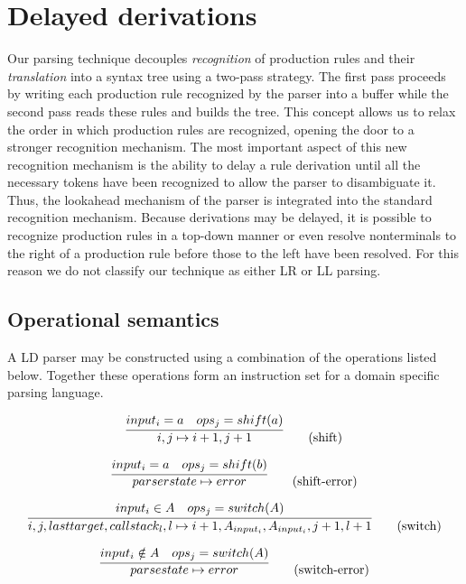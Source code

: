 \documentclass[A4]{sig-alternate}
\begin{document}
\section{Delayed derivations}

Our parsing technique decouples {\em recognition} of production rules and their {\em translation} into a syntax tree using a two-pass strategy.
The first pass proceeds by writing each production rule recognized by the parser into a buffer while the second pass reads these
rules and builds the tree.
This concept allows us to relax the order in which production rules are recognized, opening the door to a stronger recognition mechanism.
The most important aspect of this new recognition mechanism is the ability to delay a rule derivation until all the necessary tokens have been recognized
to allow the parser to disambiguate it.
Thus, the lookahead mechanism of the parser is integrated into the standard recognition mechanism.
Because derivations may be delayed, it is possible to recognize production rules in a top-down manner or even resolve nonterminals to the right of a 
production rule before those to the left have been resolved.
For this reason we do not classify our technique as either LR or LL parsing.

\subsection{Operational semantics}

A LD parser may be constructed using a combination of the operations listed below.
Together these operations form an instruction set for a domain specific parsing language.

\begin{equation}
\infer{i, j \mapsto i+1, j+1}{input_i = a & ops_j = shift(a)} \tag{shift}
\end{equation}

\begin{equation}
\infer{parserstate \mapsto error}{input_i = a & ops_j = shift(b)} \tag{shift-error}
\end{equation}

\begin{equation}
\infer{i, j, lasttarget, callstack_l, l \mapsto i+1, A_{input_i}, A_{input_i}, j+1, l+1}{input_i \in A & ops_j = switch(A)} \tag{switch}
\end{equation}

\begin{equation}
\infer{parsestate \mapsto error}{input_i \notin A & ops_j = switch(A)} \tag{switch-error}
\end{equation}
\end{document}
